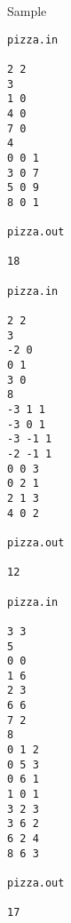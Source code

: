 Sample
\begin{verbatim}
pizza.in 
 
2 2 
3 
1 0 
4 0 
7 0 
4 
0 0 1 
3 0 7 
5 0 9 
8 0 1 
 
pizza.out 
 
18 

pizza.in 
 
2 2 
3 
-2 0 
0 1 
3 0 
8 
-3 1 1 
-3 0 1 
-3 -1 1 
-2 -1 1 
0 0 3 
0 2 1 
2 1 3 
4 0 2 
 
pizza.out 
 
12 

pizza.in 
 
3 3 
5 
0 0 
1 6 
2 3 
6 6 
7 2 
8 
0 1 2 
0 5 3 
0 6 1 
1 0 1 
3 2 3 
3 6 2 
6 2 4 
8 6 3 
 
pizza.out 
 
17 
\end{verbatim}